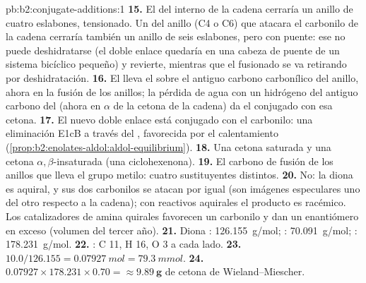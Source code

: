 \begin{solution}{pb:b2:conjugate-additions:1}
\textbf{15.} El  del  interno de la cadena cerraría un anillo de cuatro eslabones, tensionado. Un 
del anillo (C4 o C6) que atacara el carbonilo de la cadena cerraría también un anillo de seis eslabones, pero con puente: ese 
no puede deshidratarse (el doble enlace quedaría en una cabeza de puente de un sistema bicíclico pequeño) y revierte,
mientras que el  fusionado se va retirando por deshidratación.
\textbf{16.} El  lleva el  sobre el antiguo carbono carbonílico del anillo, ahora en la fusión de los anillos; la pérdida
de agua con un hidrógeno del antiguo carbono del  (ahora en $\alpha$ de la cetona de la cadena) da el
 conjugado con esa cetona.
\textbf{17.} El nuevo doble enlace está conjugado con el carbonilo: una eliminación E1cB a través del
, favorecida por el calentamiento (\cref{prop:b2:enolates-aldol:aldol-equilibrium}).
\textbf{18.} Una cetona saturada y una cetona $\alpha,\beta$-insaturada (una ciclohexenona).
\textbf{19.} El carbono de fusión de los anillos que lleva el grupo metilo: cuatro sustituyentes distintos.
\textbf{20.} No: la diona es aquiral, y sus dos carbonilos se atacan por igual (son imágenes especulares
uno del otro respecto a la cadena); con reactivos aquirales el producto es racémico. Los catalizadores de amina
quirales favorecen un carbonilo y dan un enantiómero en exceso (volumen del tercer año).
\textbf{21.} Diona : \qty{126.155}{g/mol}; : \qty{70.091}{g/mol}; :
\qty{178.231}{g/mol}.
\textbf{22.} : C 11, H 16, O 3 a cada lado.
\textbf{23.} $10.0/126.155 = \qty{0.07927}{mol} = \qty{79.3}{mmol}$.
\textbf{24.} $0.07927 \times 178.231 \times 0.70 = \boldsymbol{\approx \qty{9.89}{g}}$ de
cetona de Wieland--Miescher.
\end{solution}
